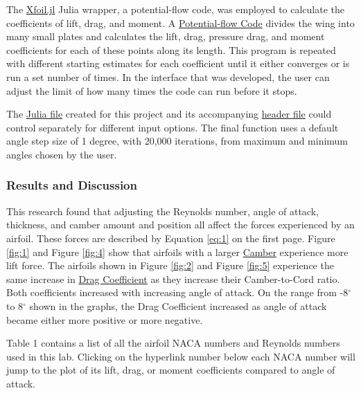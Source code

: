 \documentclass{article}
\begin{document}
The \href{https://docs.juliahub.com/Xfoil/Mlbda/0.4.0/}{Xfoil.jl} Julia wrapper, a potential-flow code, was employed to calculate the coefficients of lift, drag, and moment. A \hyperlink{PFC}{Potential-flow Code} divides the wing into many small plates and calculates the lift, drag, pressure drag, and moment coefficients for each of these points along its length. This program is repeated with different starting estimates for each coefficient until it either converges or is run a set number of times. In the interface that was developed, the user can adjust the limit of how many times the code can run before it stops.\newline

The \href{https://github.com/JoeSpencer1/497R-Projects/blob/Airfoil-Analysis/Airfoil_Analysis.jl}{Julia file} created for this project and its accompanying \href{https://github.com/JoeSpencer1/497R-Projects/blob/Airfoil-Analysis/Airfoil_Functions.jl}{header file} could control separately for different input options. The final function uses a default angle step size of 1 degree, with 20,000 iterations, from maximum and minimum angles chosen by the user.\newline

\subsubsection*{Results and Discussion}

This research found that adjusting the Reynolds number, angle of attack, thickness, and camber amount and position all affect the forces experienced by an airfoil. These forces are described by Equation \ref{eq:1} on the first page. Figure \ref{fig:1} and Figure \ref{fig:4} show that airfoils with a larger \hyperlink{c}{Camber} experience more lift force. The airfoils shown in Figure \ref{fig:2} and Figure \ref{fig:5} experience the same increase in \hyperlink{CD}{Drag Coefficient} as they increase their Camber-to-Cord ratio. Both coefficients increased with increasing angle of attack. On the range from -8$^{\circ}$ to 8$^{\circ}$ shown in the graphs, the Drag Coefficient increased as angle of attack became either more positive or more negative.\newline

Table 1 contains a list of all the airfoil NACA numbers and Reynolds numbers used in this lab. Clicking on the \color{blue}hyperlink number \color{black} below each NACA number will jump to the plot of its lift, drag, or moment coefficients compared to angle of attack. \newline
\end{document}
